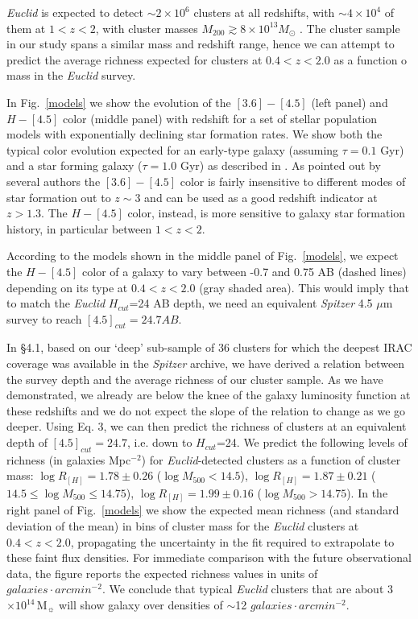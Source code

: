 \documentclass[apj,twocolumn]{emulateapj}
\begin{document}
{{\it Euclid} is expected to detect $\sim 2 \times 10^{6}$ clusters at all redshifts, with $\sim 4 \times 10^{4}$ of them at $1 < z < 2$, with cluster masses $M_{200} \gtrsim 8 \times 10^{13} M_{\odot}$  \citep{Sartoris16}. The cluster sample in our study spans a similar mass and redshift range, hence we can attempt to predict the average richness expected for clusters at $0.4 <z < 2.0$ as a function o mass in the {\it Euclid} survey.

In Fig.~\ref{models} we show the evolution of the $[3.6]-[4.5]$ (left panel) and  $H-[4.5 ]$ color (middle panel) with redshift for a set of \citet{BC03}  stellar population models with exponentially declining star formation rates. We show both the typical color evolution expected for an early-type galaxy (assuming $\tau=0.1$ Gyr) and a star forming galaxy  ($\tau=1.0$ Gyr) as described in \citet{Rettura10,Rettura11}. As pointed out by several authors \citep[e.g.,][]{Papovich08, Muzzin13, Wylezalek13, Rettura14} the $[3.6]-[4.5]$ color is fairly insensitive to different modes of star formation out to $z\sim 3$ and can be used as a good redshift indicator at $z>1.3$.  The $H-[4.5]$ color, instead, is more sensitive to galaxy star formation history, in particular between $1 < z < 2$. 

According to the models shown in the middle panel of Fig.~\ref{models}, we expect the $H-[4.5 ]$ color of a galaxy to vary between -0.7 and 0.75 AB (dashed lines) depending on its type at $0.4 <z < 2.0$  (gray shaded area). This would imply that to match the {\it Euclid} $H_{cut}$=24 AB depth, we need an equivalent {\it Spitzer} 4.5 $\mu$m survey to reach $[4.5]_{cut}=24.7 AB$.

In \S 4.1, based on our `deep' sub-sample of 36 clusters for which the deepest IRAC coverage was available in the {\it Spitzer} archive, we have derived a relation between the survey depth and the average richness of our cluster sample. As we have demonstrated, we already are below the knee of the galaxy luminosity function at these redshifts and we do not expect the slope of the relation to change as we go deeper.
Using Eq. 3, we can then predict the richness of clusters at an equivalent depth of $[4.5]_{cut}=24.7$, i.e. down to $H_{cut}$=24. We predict the following levels of richness (in galaxies Mpc$^{-2}$) for {\it Euclid}-detected clusters as a function of cluster mass: $\log R_{[H]}=1.78 \pm 0.26$ ($\log M_{500} < 14.5$), $\log R_{[H]}=1.87 \pm 0.21$ ($14.5 \leq \log M_{500} \leq 14.75$), $\log R_{[H]}=1.99 \pm 0.16$ ($\log M_{500} > 14.75$).
In the right panel of Fig.~\ref{models} we show the expected mean richness (and standard deviation of the mean) in bins of cluster mass for the {\it Euclid} clusters at $0.4 <z < 2.0$, propagating
the uncertainty in the fit required to extrapolate to these faint flux densities. For immediate comparison with the future observational data, the figure reports the expected richness values in units of $galaxies \cdot arcmin^{-2}$.  We conclude that typical {\it Euclid} clusters that are about 3$\times10^{14}$\,M$_{\sun}$ will show galaxy over densities of $\sim$12 $galaxies \cdot arcmin^{-2}$. 

}
\end{document}
